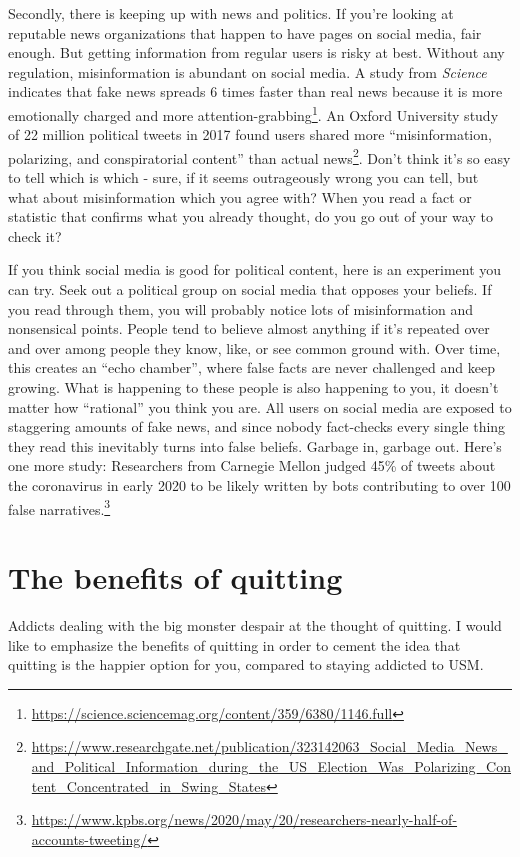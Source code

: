 \documentclass[
  openany]{book}
\begin{document}
Secondly, there is keeping up with news and politics. If you're looking at reputable news organizations that happen to have pages on social media, fair enough. But getting information from regular users is risky at best. Without any regulation, misinformation is abundant on social media. A study from \emph{Science} indicates that fake news spreads 6 times faster than real news because it is more emotionally charged and more attention-grabbing\footnote{\url{https://science.sciencemag.org/content/359/6380/1146.full}}. An Oxford University study of 22 million political tweets in 2017 found users shared more ``misinformation, polarizing, and conspiratorial content'' than actual news\footnote{\url{https://www.researchgate.net/publication/323142063_Social_Media_News_and_Political_Information_during_the_US_Election_Was_Polarizing_Content_Concentrated_in_Swing_States}}. Don't think it's so easy to tell which is which - sure, if it seems outrageously wrong you can tell, but what about misinformation which you agree with? When you read a fact or statistic that confirms what you already thought, do you go out of your way to check it?

If you think social media is good for political content, here is an experiment you can try. Seek out a political group on social media that opposes your beliefs. If you read through them, you will probably notice lots of misinformation and nonsensical points. People tend to believe almost anything if it's repeated over and over among people they know, like, or see common ground with. Over time, this creates an ``echo chamber'', where false facts are never challenged and keep growing. What is happening to these people is also happening to you, it doesn't matter how ``rational'' you think you are. All users on social media are exposed to staggering amounts of fake news, and since nobody fact-checks every single thing they read this inevitably turns into false beliefs. Garbage in, garbage out. Here's one more study: Researchers from Carnegie Mellon judged 45\% of tweets about the coronavirus in early 2020 to be likely written by bots contributing to over 100 false narratives.\footnote{\url{https://www.kpbs.org/news/2020/may/20/researchers-nearly-half-of-accounts-tweeting/}}

\section{The benefits of quitting}\label{the-benefits-of-quitting}

Addicts dealing with the big monster despair at the thought of quitting. I would like to emphasize the benefits of quitting in order to cement the idea that quitting is the happier option for you, compared to staying addicted to USM.
\end{document}
